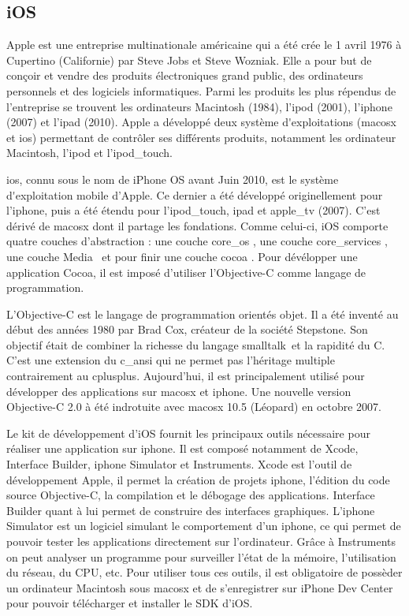 \subsection{iOS}
	Apple est une entreprise multinationale américaine qui a été crée le 1
	avril 1976 à Cupertino (Californie) par Steve Jobs et Steve Wozniak. Elle a
	pour but de conçoir et vendre des produits électroniques grand public, des
	ordinateurs personnels et des logiciels informatiques. Parmi les produits les
	plus répendus de l'entreprise se trouvent les ordinateurs Macintosh (1984),
	l'\gls{ipod} (2001), l'\gls{iphone} (2007) et l'\gls{ipad} (2010). Apple a
	développé deux \glspl{système d'exploitation} (\gls{macosx} et \gls{ios})
	permettant de contrôler ses différents produits, notamment les ordinateur 
	Macintosh, l'\gls{ipod} et l'\gls{ipod_touch}.
			
	\gls{ios}, connu sous le nom de iPhone OS avant Juin 2010, est le \gls{système
	d'exploitation}  mobile d'Apple. Ce dernier a été développé originellement 
	pour l'\gls{iphone}, puis a été étendu pour l'\gls{ipod_touch}, \gls{ipad} et
	\gls{apple_tv} (2007). C'est dérivé de \gls{macosx}  dont il partage les 
	fondations. Comme celui-ci, iOS comporte quatre couches d'abstraction : une
	couche \og \gls{core_os} \fg, une couche \og \gls{core_services} \fg, une
	couche \og Media \fg \, et pour finir une couche \og \gls{cocoa} \fg. Pour
	dévélopper une application Cocoa, il est imposé d'utiliser l'Objective-C comme
	langage de programmation.
			
	L'Objective-C est le langage de programmation orientés objet. Il a été inventé
	au début des années 1980 par Brad Cox, créateur de la société Stepstone. Son
	objectif était de combiner la richesse du langage \gls{smalltalk}\, et la
	rapidité du C. 
	C'est une extension du \gls{c_ansi} qui ne permet pas l'héritage multiple
	contrairement au \gls{cplusplus}. Aujourd'hui, il est principalement utilisé
	pour développer des applications sur \gls{macosx} et \gls{iphone}. Une nouvelle version
	Objective-C 2.0 à été indrotuite avec \gls{macosx} 10.5 (Léopard) en octobre 2007.
			
	Le kit de développement d'iOS fournit les principaux outils nécessaire pour
	réaliser une application sur \gls{iphone}. Il est composé notamment de Xcode,
	Interface Builder, \gls{iphone} Simulator et Instruments. Xcode est l'outil de
	développement Apple, il permet la création de projets \gls{iphone}, l’édition du code
	source Objective-C, la compilation et le débogage des applications. Interface
	Builder quant à lui permet de construire des interfaces graphiques. L'\gls{iphone}
	Simulator est un logiciel simulant le comportement d'un \gls{iphone}, ce qui 
	permet de pouvoir tester les applications directement sur l'ordinateur. Grâce
	à Instruments on peut analyser un programme pour surveiller l’état de la
	mémoire, l’utilisation du réseau, du CPU, etc. Pour utiliser tous ces outils,
	il est obligatoire de possèder un ordinateur Macintosh sous \gls{macosx} et de
	s'enregistrer sur iPhone Dev Center pour pouvoir télécharger et installer le SDK d'iOS.
